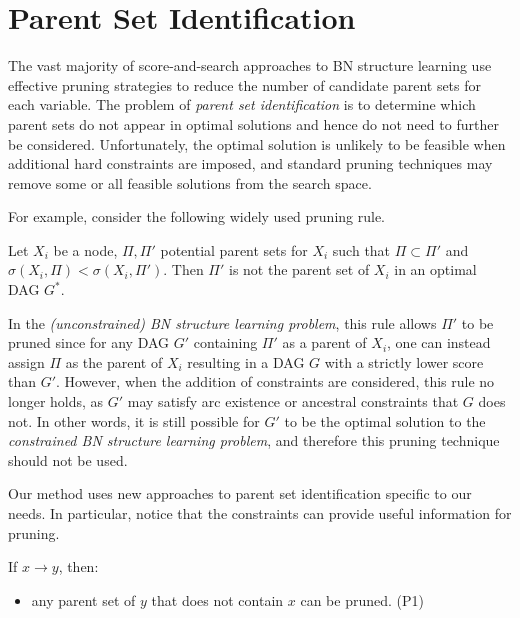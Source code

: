 \documentclass[twoside,11pt]{article}
\begin{document}
\section{Parent Set Identification}
\label{SECTION:ParentSetIdentification}

The vast majority of score-and-search approaches to BN structure learning use effective pruning strategies to reduce the number of candidate parent sets for each
variable. The problem of \emph{parent set identification} is to determine which parent sets do not appear in optimal solutions and hence do not need to further be considered.
Unfortunately, the optimal solution is unlikely to be feasible when additional hard constraints are imposed, and standard pruning techniques may remove some or all feasible
solutions from the search space. 

\medskip
For example, consider the following widely used pruning rule.

\begin{lemma}

Let $X_i$ be a node, $\Pi, \Pi'$ potential parent sets for $X_i$ such that 
$\Pi \subset \Pi'$ and $\sigma(X_i, \Pi) < \sigma(X_i, \Pi')$. Then $\Pi'$ is
not the parent set of $X_i$ in an optimal DAG $G^*$. 
\end{lemma}

In the \emph{(unconstrained) BN structure learning problem}, this rule allows $\Pi'$ to be pruned since for any DAG $G'$ containing $\Pi'$ as a parent of $X_i$, 
one can instead assign $\Pi$ as the parent of $X_i$ resulting in a DAG $G$ with a strictly lower score than $G'$. However, when the addition of constraints are considered, this rule 
no longer holds, as $G'$ may satisfy arc existence or ancestral constraints that $G$ does not. In other words, it is still possible for $G'$ to be the optimal solution
to the \emph{constrained BN structure learning problem}, and therefore this pruning technique should not be used. 

\medskip

Our method uses new approaches to parent set identification specific to our needs. In particular, notice that the constraints can provide useful information for pruning. 

\medskip
If $x \rightarrow y$, then:

	\begin{itemize}
	\item any parent set of $y$ that does not contain $x$ can be pruned. (P1)
	\end{itemize}
	
\end{document}
